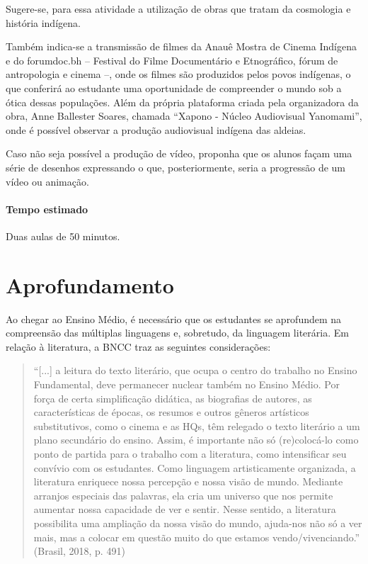 \documentclass[12pt]{extarticle}
\begin{document}
Sugere-se, para essa atividade a utilização de obras que tratam da
cosmologia e história indígena. 

Também indica-se a transmissão de filmes
da Anauê Mostra de Cinema Indígena e do forumdoc.bh – Festival do Filme 
Documentário e Etnográfico, fórum de antropologia e cinema –, onde os filmes
são produzidos pelos povos indígenas, o que conferirá ao estudante uma 
oportunidade de compreender o mundo sob a ótica dessas populações. Além da própria 
plataforma criada pela organizadora da obra, Anne Ballester Soares, chamada 
``Xapono - Núcleo Audiovisual Yanomami'', onde é possível observar a produção 
audiovisual indígena das aldeias. 

Caso não seja possível a produção de vídeo, proponha que os alunos façam 
uma série de desenhos expressando o que, posteriormente, seria a progressão 
de um vídeo ou animação.


\paragraph{Tempo estimado} Duas aulas de 50 minutos.


\section{Aprofundamento}

Ao chegar ao Ensino Médio, é necessário que os estudantes se aprofundem
na compreensão das múltiplas linguagens e, sobretudo, da linguagem
literária. Em relação à literatura, a BNCC traz as seguintes
considerações:

\begin{quote}
``{[}...{]} a leitura do texto literário, que ocupa o centro do trabalho
no Ensino Fundamental, deve permanecer nuclear também no Ensino Médio.
Por força de certa simplificação didática, as biografias de autores, as
características de épocas, os resumos e outros gêneros artísticos
substitutivos, como o cinema e as HQs, têm relegado o texto literário a
um plano secundário do ensino. Assim, é importante não só (re)colocá-lo
como ponto de partida para o trabalho com a literatura, como
intensificar seu convívio com os estudantes. Como linguagem
artisticamente organizada, a literatura enriquece nossa percepção e
nossa visão de mundo. Mediante arranjos especiais das palavras, ela cria
um universo que nos permite aumentar nossa capacidade de ver e sentir.
Nesse sentido, a literatura possibilita uma ampliação da nossa visão do
mundo, ajuda-nos não só a ver mais, mas a colocar em questão muito do
que estamos vendo/vivenciando.'' (Brasil, 2018, p. 491)
\end{quote}
\end{document}
